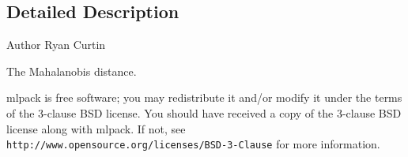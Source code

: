 \subsection{Detailed Description}
\begin{DoxyAuthor}{Author}
Ryan Curtin
\end{DoxyAuthor}
The Mahalanobis distance.

mlpack is free software; you may redistribute it and/or modify it under the terms of the 3-\/clause B\+SD license. You should have received a copy of the 3-\/clause B\+SD license along with mlpack. If not, see {\tt http\+://www.\+opensource.\+org/licenses/\+B\+S\+D-\/3-\/\+Clause} for more information. 